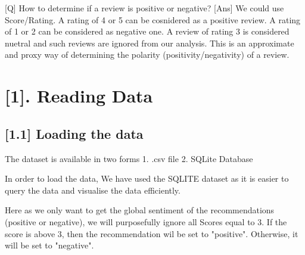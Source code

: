 \documentclass[11pt]{article}
\begin{document}
 {[}Q{]} How to determine if a review is positive or negative? {[}Ans{]}
We could use Score/Rating. A rating of 4 or 5 can be cosnidered as a
positive review. A rating of 1 or 2 can be considered as negative one. A
review of rating 3 is considered nuetral and such reviews are ignored
from our analysis. This is an approximate and proxy way of determining
the polarity (positivity/negativity) of a review.

    \section{{[}1{]}. Reading Data}\label{reading-data}

    \subsection{{[}1.1{]} Loading the data}\label{loading-the-data}

The dataset is available in two forms 1. .csv file 2. SQLite Database

In order to load the data, We have used the SQLITE dataset as it is
easier to query the data and visualise the data efficiently.

Here as we only want to get the global sentiment of the recommendations
(positive or negative), we will purposefully ignore all Scores equal to
3. If the score is above 3, then the recommendation wil be set to
"positive". Otherwise, it will be set to "negative".
\end{document}
